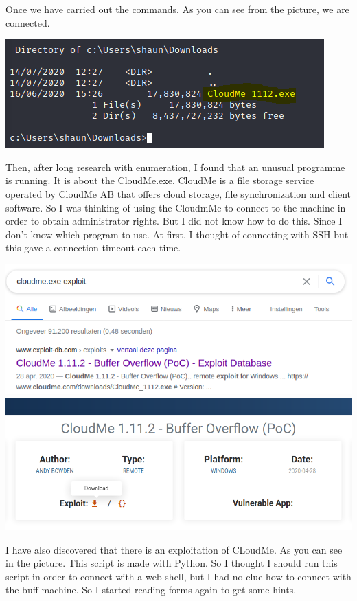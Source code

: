 \documentclass[../main.tex]{subfiles}
\begin{document}
Once we have carried out the commands. As you can see from the picture, we are connected. 

\includegraphics[width=\linewidth]{images/Boyan/HackTheBox_16_Boyan.PNG}

Then, after long research with enumeration, I found that an unusual programme is running. It is about the CloudMe.exe. CloudMe is a file storage service operated by CloudMe AB that offers cloud storage, file synchronization and client software. So I was thinking of using the CloudmMe to connect to the machine in order to obtain administrator rights. But I did not know how to do this. Since I don't know which program to use. At first, I thought of connecting with SSH but this gave a connection timeout each time. 

\includegraphics[width=\linewidth]{images/Boyan/HackTheBox_17_Boyan.PNG}
\includegraphics[width=\linewidth]{images/Boyan/HackTheBox_18_Boyan.PNG}

I have also discovered that there is an exploitation of CLoudMe. As you can see in the picture. This script is made with Python. So I thought I should run this script in order to connect with a web shell, but I had no clue how to connect with the buff machine. So I started reading forms again to get some hints.
\end{document}
